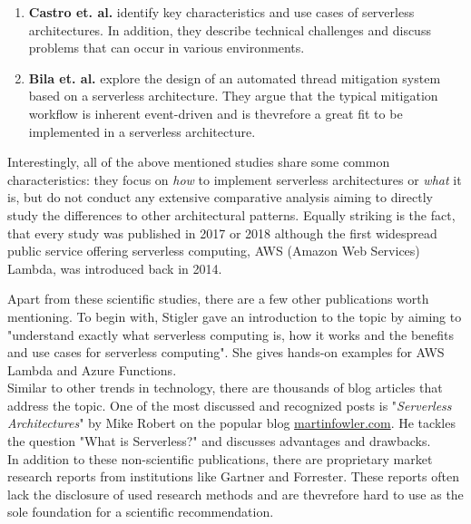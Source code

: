 \begin{enumerate}
    \item 
        \textbf{Castro et. al.} identify key characteristics and use cases of serverless architectures. In addition, they describe technical challenges and discuss problems that can occur in various environments.
    \item
        \textbf{Bila et. al.} explore the design of an automated thread mitigation system based on a serverless architecture. They argue that the typical mitigation workflow is inherent event-driven and is thevrefore a great fit to be implemented in a serverless architecture.  \autocite{Bila2017LeveragingContainers}
\end{enumerate}

Interestingly, all of the above mentioned studies share some common characteristics: they focus on \textit{how} to implement serverless architectures or \textit{what} it is, but do not conduct any extensive comparative analysis aiming to directly study the differences to other architectural patterns. Equally striking is the fact, that every study was published in 2017 or 2018 although the first widespread public service offering serverless computing, AWS (Amazon Web Services) Lambda, was introduced back in 2014.\autocite{Lindblom2014AWSBlog}

Apart from these scientific studies, there are a few other publications worth mentioning. To begin with, Stigler gave an introduction to the topic by aiming to "understand exactly what serverless computing is, how it works and the benefits and use cases for serverless computing". She gives hands-on examples for AWS Lambda and Azure Functions.\autocite{Stigler2018UnderstandingComputing}\\
Similar to other trends in technology, there are thousands of blog articles that address the topic. One of the most discussed and recognized posts is "\textit{Serverless Architectures}" by Mike Robert on the popular blog \url{martinfowler.com}\autocite{Roberts2016ServerlessArchitectures}. He tackles the question "What is Serverless?" and discusses advantages and drawbacks. \\
In addition to these non-scientific publications, there are proprietary market research reports from institutions like Gartner
\autocite{Smith2017Hype2017}\highcomma
\autocite{Weiss2017Hype2017}\highcomma
\autocite{Natis2017Hype2017}\highcomma
\autocite{Walker2017Hype2017}\highcomma
\autocite{DawsonPhilip2017Hype2017}
and Forrester\autocite{Hammond2018DemystifyingComputing}. These reports often lack the disclosure of used research methods and are thevrefore hard to use as the sole foundation for a scientific recommendation. 

